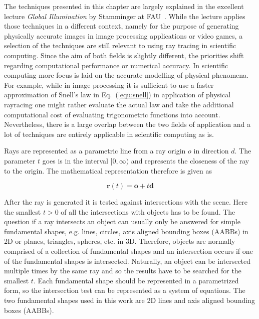 \documentclass[a4paper,10pt]{article}
\renewcommand{\vec}[1]{\mathbf{#1}}
\newcommand{\equref}[1]{Eq.~(\ref{#1})}
\begin{document}
    The techniques presented in this chapter are largely explained
    in the excellent lecture \emph{Global Illumination} by 
    Stamminger at FAU~\cite{globillum}.
    While the lecture applies those techniques in a different context,
    namely for the purpose of generating physically accurate images
    in image processing applications or video games,
    a selection of the techniques are still relevant to using
    ray tracing in scientific computing.
    Since the aim of both fields is slightly different, the priorities
    shift regarding computational performance or numerical
    accuracy.
    In scientific computing more focus is laid on the accurate modelling
    of physical phenomena.
    For example, while in image processing it is sufficient to use a
    faster approximation of Snell's law in \equref{equ:snell} in application
    of physical rayracing one might rather evaluate the actual law and
    take the additional computational cost of evaluating trigonometric
    functions into account.
    Nevertheless, there is a large overlap between the two fields of
    application and a lot of techniques are entirely applicable
    in scientific computing as is.

    Rays are represented as a parametric line from a ray origin $o$ in
    direction $d$.
    The parameter $t$ goes is in the interval $[0, \infty)$ and represents
    the closeness of the ray to the origin.
    The mathematical representation therefore is given as

    \begin{equation}
        \label{equ:ray}
        \vec{r}(t) = \vec{o} + t\vec{d}
    \end{equation}

    After the ray is generated it is tested against intersections with the
    scene.
    Here the smallest $t > 0$ of all the intersections with objects has to
    be found.
    The question if a ray intersects an object can usually only be answered
    for simple fundamental shapes, e.g. lines, circles, axis aligned bounding
    boxes (AABBs) in 2D or planes, triangles, spheres, etc. in 3D.
    Therefore, objects are normally comprised of a collection of fundamental
    shapes and an intersection occurs if one of the fundamental shapes is
    intersected.
    Naturally, an object can be intersected multiple times by the same ray
    and so the results have to be searched for the smallest $t$.
    Each fundamental shape should be represented in a parametrized form, 
    so the intersection test can be represented as a system of equations.
    The two fundamental shapes used in this work are 2D lines and axis
    aligned bounding boxes (AABBs).
\end{document}

